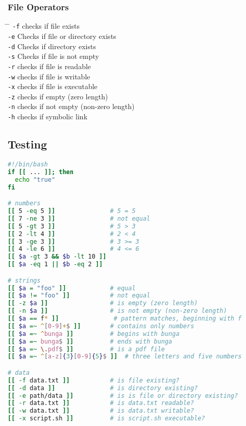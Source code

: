 \documentclass[a4paper,10pt]{article}
\begin{document}
\subsubsection*{File Operators}
\begin{tabbing}
	\= \hspace{30mm} \= \hspace{50mm} \kill
	\> \verb|-f| \> checks if file exists \\
	\> \verb|-e| \> Checks if file or directory exists \\
	\> \verb|-d| \> Checks if directory exists \\
	\> \verb|-s| \> Checks if file is not empty \\
	\> \verb|-r| \> checks if file is readable \\
	\> \verb|-w| \> checks if file is writable \\
	\> \verb|-x| \> checks if file is executable \\
	\> \verb|-z| \> checks if empty (zero length) \\
	\> \verb|-n| \> checks if not empty (non-zero length) \\
	\> \verb|-h| \> checks if symbolic link \\
\end{tabbing}

\subsection{Testing}
\begin{lstlisting}[language=bash]
#!/bin/bash 
if [[ ... ]]; then 
  echo "true"
fi 

# numbers
[[ 5 -eq 5 ]]               # 5 = 5 
[[ 7 -ne 3 ]]               # not equal 
[[ 5 -gt 3 ]]               # 5 > 3 
[[ 2 -lt 4 ]]               # 2 < 4 
[[ 3 -ge 3 ]]               # 3 >= 3 
[[ 4 -le 6 ]]               # 4 <= 6
[[ $a -gt 3 && $b -lt 10 ]]
[[ $a -eq 1 || $b -eq 2 ]]

# strings 
[[ $a = "foo" ]]            # equal 
[[ $a != "foo" ]]           # not equal 
[[ -z $a ]]                 # is empty (zero length)
[[ -n $a ]]                 # is not empty (non-zero length)
[[ $a == f* ]]               # pattern matches, beginning with f 
[[ $a =~ ^[0-9]+$ ]]        # contains only numbers 
[[ $a =~ ^bunga ]]          # begins with bunga 
[[ $a =~ bunga$ ]]          # ends with bunga 
[[ $a =~ \.pdf$ ]]          # is a pdf file 
[[ $a =~ ^[a-z]{3}[0-9]{5}$ ]]  # three letters and five numbers

# data 
[[ -f data.txt ]]           # is file existing?
[[ -d data ]]               # is directory existing? 
[[ -e path/data ]]          # is is file or directory existing?
[[ -r data.txt ]]           # is data.txt readable? 
[[ -w data.txt ]]           # is data.txt writable? 
[[ -x script.sh ]]          # is script.sh executable?
\end{lstlisting}
\end{document}
